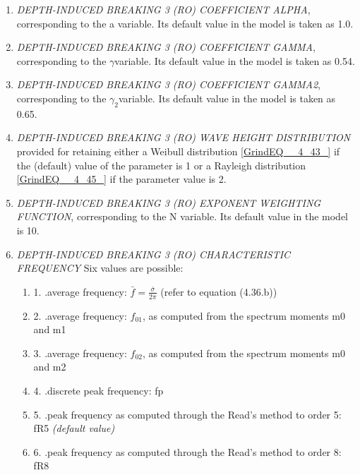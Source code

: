 \begin{enumerate}
\item  \textit{DEPTH-INDUCED BREAKING 3 (RO) COEFFICIENT ALPHA}, corresponding to the a  variable. Its default value in the model is taken as 1.0.

\item  \textit{DEPTH-INDUCED BREAKING 3 (RO) COEFFICIENT GAMMA},
 corresponding to the $\gamma $variable. Its default value in the model is taken as 0.54.

\item  \textit{DEPTH-INDUCED BREAKING 3 (RO) COEFFICIENT GAMMA2},  corresponding to the $\gamma _{2} $variable. Its default value in the model is taken as 0.65.

\item  \textit{DEPTH-INDUCED BREAKING 3 (RO) WAVE HEIGHT DISTRIBUTION} provided for retaining either a Weibull distribution \eqref{GrindEQ__4_43_} if the (default) value of the parameter is 1 or a Rayleigh distribution \eqref{GrindEQ__4_45_} if the parameter value is 2.

\item  \textit{DEPTH-INDUCED BREAKING 3 (RO) EXPONENT WEIGHTING FUNCTION}, corresponding to the N variable. Its default value in the model is 10.

\item  \textit{DEPTH-INDUCED BREAKING 3 (RO) CHARACTERISTIC FREQUENCY} Six values are possible:\textit{}
\begin{enumerate}

 \item 1. .average frequency: $\bar{f}=\frac{\bar{\sigma }}{2\pi } $  (refer to equation (4.36.b))

 \item 2. .average frequency: $f_{01} $, as computed from the spectrum moments m0 and m1

 \item 3. .average frequency: $f_{02} $, as computed from the spectrum moments m0 and m2

 \item 4. .discrete peak frequency: fp

 \item 5. .peak frequency as computed through the Read's method to order 5: fR5 \textit{(default value)}

 \item 6. .peak frequency as computed through the Read's method to order 8: fR8
\end{enumerate}
\end{enumerate}


